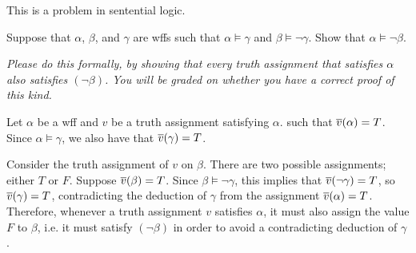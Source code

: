\begin{problem}
  This is a problem in sentential logic.

  \step
  Suppose that $\alpha$, $\beta$, and $\gamma$ are wffs
  such that $\alpha \models \gamma$ and $\beta \models \lnot \gamma$.
  Show that $\alpha \models \lnot \beta$.

  \step
  \emph{
    Please do this formally, by showing that every truth assignment that
    satisfies $\alpha$ also satisfies $(\lnot \beta)$.
    You will be graded on whether you have a
    correct proof of this kind.
  }
\end{problem}
\begin{Answer}
  Let $\alpha$ be a wff and $v$ be a truth assignment satisfying $\alpha$.
  such that  $\overline{v}(\alpha) = T$.
  Since $\alpha \models \gamma$, we also have that $\overline{v}(\gamma) = T$.

  \step
  Consider the truth assignment of $v$ on $\beta$.
  There are two possible assignments; either $T$ or $F$.
  Suppose $\overline{v}(\beta) = T$. Since $\beta \models \lnot \gamma$,
  this implies that $\overline{v}(\lnot \gamma) = T$, so $\overline{v}(\gamma) = T$,
  contradicting the deduction of $\gamma$ from the assignment $\overline{v}(\alpha) = T$.
  Therefore, whenever a truth assignment $v$ satisfies $\alpha$,
  it must also assign the value $F$ to $\beta$, i.e. it must satisfy $(\lnot \beta)$
  in order to avoid a contradicting deduction of $\gamma$.
\end{Answer}

